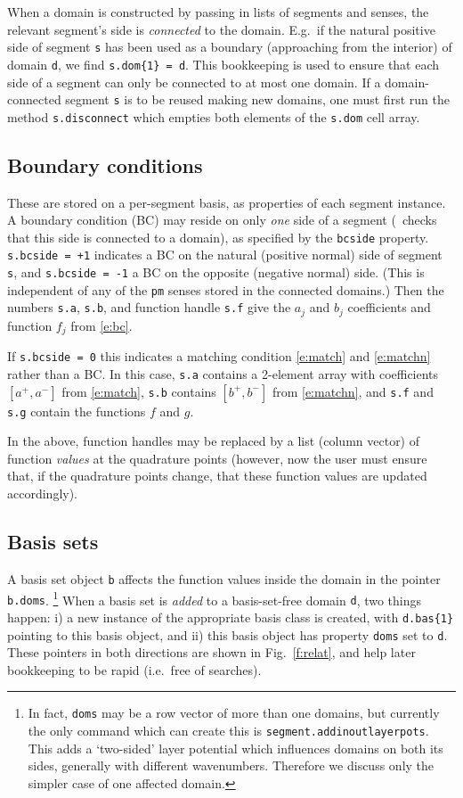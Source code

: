 \documentclass[12pt]{article}
\begin{document}
When a domain is constructed by passing in lists of segments
and senses, the relevant segment's side is {\em connected} to the domain.
E.g.\ if the natural positive side of segment {\tt s} has been used
as a boundary (approaching from the interior) of domain {\tt d},
we find \verb?s.dom{1} = d?.
This bookkeeping is used to ensure that each side of a segment
can only be connected to at most one domain.
If a domain-connected segment {\tt s} is to be reused making new domains,
one must first run the method {\tt s.disconnect}
which empties both elements of the {\tt s.dom} cell array.


\subsection{Boundary conditions}

These are stored on a per-segment basis, as properties of each segment
instance. A boundary condition (BC) may reside on only {\em one} side of a
segment (\mpspack\ checks that this side is connected to a domain),
as specified by the {\tt bcside} property.
{\tt s.bcside = +1} indicates a BC on the natural (positive
normal) side of segment {\tt s}, and {\tt s.bcside = -1} a BC on the
opposite (negative normal) side.
(This is independent of any of the {\tt pm} senses stored in the connected
domains.)
Then the numbers {\tt s.a}, {\tt s.b},
and function handle {\tt s.f} give the
$a_j$ and $b_j$ coefficients and function $f_j$ from \eqref{e:bc}.

If {\tt s.bcside = 0} this indicates a matching condition
\eqref{e:match} and \eqref{e:matchn} rather than a BC. In this case,
{\tt s.a} contains a 2-element array with coefficients
$[a^+, a^-]$ from \eqref{e:match}, {\tt s.b} contains
$[b^+, b^-]$ from \eqref{e:matchn},
and {\tt s.f} and {\tt s.g} contain the functions $f$ and $g$.

In the above, function handles may be replaced by a list (column vector)
of function {\em values}
at the quadrature points (however, now the user must ensure that, if
the quadrature points change, that these function values are updated
accordingly).


\subsection{Basis sets}

A basis set object {\tt b} affects the
function values inside the domain in the pointer {\tt b.doms}.%
  \footnote{In fact, {\tt doms} may be a row vector of more than one domains,
but currently the only command
    which can create this is
    {\tt segment.addinoutlayerpots}. This adds a `two-sided' layer potential
which influences domains on both its sides, generally with different wavenumbers. Therefore we discuss only the simpler
    case of one affected domain.}
When a basis set is {\em added} to a basis-set-free domain {\tt d},
two things happen: i) a new instance of the appropriate basis class
is created, with \verb?d.bas{1}? pointing to this basis object,
and ii) this basis object has property {\tt doms} set to {\tt d}.
These pointers in both directions are shown in Fig.~\ref{f:relat},
and help later bookkeeping to be rapid (i.e.\ free of searches).
\end{document}
